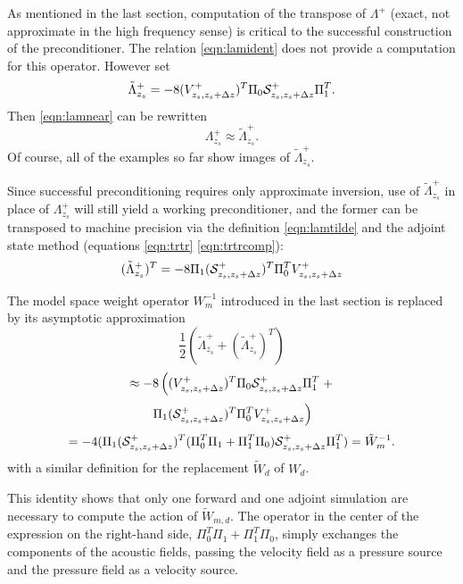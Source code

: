 As mentioned in the last section, computation of the transpose of
$\Lambda^+$ (exact, not approximate in the high frequency sense) is
critical to the successful construction of the preconditioner. The
relation \ref{eqn:lamident} does not provide a computation for this
operator. However set
\begin{equation}
  \label{eqn:lamtilde}
  \tilde{\Lambda}^+_{z_s} = -8(V^{+}_{z_s,z_s+\Delta z})^T\Pi_0 {\cal
    S}^+_{z_s,z_s+\Delta z}\Pi_1^T.
\end{equation}
Then \ref{eqn:lamnear} can be rewritten
\[
  \Lambda^+_{z_s} \approx \tilde{\Lambda}^+_{z_s}.
\]
Of course, all of the examples so far show images of
$\tilde{\Lambda}^+_{z_s}$.

Since successful preconditioning requires only approximate inversion,
use of $\tilde{\Lambda}^+_{z_s} $ in place of $\Lambda^+_{z_s}$ will
still yield a working preconditioner, and the former can be transposed
to machine precision via the definition \ref{eqn:lamtilde} and the adjoint state
method (equations \ref{eqn:trtr} \ref{eqn:trtrcomp}):
\begin{equation}
  \label{eqn:lamtransp}
  (\tilde{\Lambda}^+_{z_s})^T = -8 \Pi_1 ({\cal S}^+_{z_s,z_s+\Delta
    z})^T\Pi_0^T V^{+}_{z_s,z_s+\Delta z}
\end{equation}


The model space weight operator $W_m^{-1}$ introduced in the last section is
replaced by its asymptotic approximation
\[
\frac{1}{2}(\tilde{\Lambda}^+_{z_s} +
  (\tilde{\Lambda}^+_{z_s})^T)
\]
\[
  \approx -8 \left((V^{+}_{z_s,z_s+\Delta z})^T\Pi_0 {\cal
    S}^+_{z_s,z_s+\Delta z}\Pi_1^T \right.+
\]
\[
  \left. \Pi_1 ({\cal S}^+_{z_s,z_s+\Delta
      z})^T\Pi_0^T V^{+}_{z_s,z_s+\Delta z}\right)
\]
\begin{equation}
  \label{eqn:winvcomp}
  = -4(\Pi_1 ({\cal S}^+_{z_s,z_s+\Delta z})^T(\Pi_0^T\Pi_1 +
  \Pi_1^T\Pi_0) {\cal S}^+_{z_s,z_s+\Delta z}\Pi_1^T) = \tilde{W}_m^{-1} .
\end{equation}
with a similar definition for the replacement $\tilde{W}_d$ of $W_d$.

This identity shows that only one forward and one adjoint simulation
are necessary to compute the action of $\tilde{W}_{m,d}$. The operator
in the center of the expression on the right-hand side, $\Pi_0^T\Pi_1
+ \Pi_1^T\Pi_0$, simply exchanges the components of the acoustic
fields, passing the velocity field as a pressure source and the
pressure field as a velocity source.


